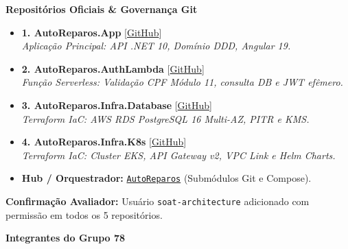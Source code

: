 \documentclass[9pt,a4paper]{article}
\begin{document}
\begin{tcolorbox}[cardbox]
    \begin{minipage}[t]{0.54\textwidth}
        \textbf{\color{accentblue} Repositórios Oficiais \& Governança Git}\par\vspace{0.12cm}
        \begin{itemize}\setlength{\itemsep}{2.5pt}\setlength{\parskip}{0pt}\footnotesize
            \item \textbf{1. AutoReparos.App} [\href{https://github.com/Grupo78-PosTech-15SOAT/AutoReparos.App}{GitHub}] \\
            \textit{Aplicação Principal: API .NET 10, Domínio DDD, Angular 19.}
            \item \textbf{2. AutoReparos.AuthLambda} [\href{https://github.com/Grupo78-PosTech-15SOAT/AutoReparos.AuthLambda}{GitHub}] \\
            \textit{Função Serverless: Validação CPF Módulo 11, consulta DB e JWT efêmero.}
            \item \textbf{3. AutoReparos.Infra.Database} [\href{https://github.com/Grupo78-PosTech-15SOAT/AutoReparos.Infra.Database}{GitHub}] \\
            \textit{Terraform IaC: AWS RDS PostgreSQL 16 Multi-AZ, PITR e KMS.}
            \item \textbf{4. AutoReparos.Infra.K8s} [\href{https://github.com/Grupo78-PosTech-15SOAT/AutoReparos.Infra.K8s}{GitHub}] \\
            \textit{Terraform IaC: Cluster EKS, API Gateway v2, VPC Link e Helm Charts.}
            \item \textbf{Hub / Orquestrador:} \href{https://github.com/Grupo78-PosTech-15SOAT/AutoReparos}{\texttt{AutoReparos}} (Submódulos Git e Compose).
        \end{itemize}
        \vspace{0.08cm}
        \textbf{\color{taggreen} Confirmação Avaliador:} Usuário \texttt{soat-architecture} adicionado com permissão em todos os 5 repositórios.
    \end{minipage}
    \hfill
    \begin{minipage}[t]{0.43\textwidth}
        \textbf{\color{accentblue} Integrantes do Grupo 78}\par\vspace{0.12cm}
        \begin{itemize}\setlength{\itemsep}{2pt}\setlength{\parskip}{0pt}\footnotesize

\end{itemize}
\end{minipage}
\end{tcolorbox}
\end{document}
